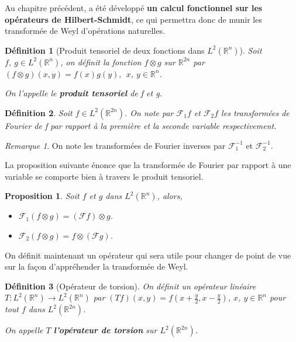 \documentclass[a4paper, 12pt]{report}
\newcommand{\R}{\mathbb{R}} %
\newcommand{\ra}[1][]{\overset{#1}{\rightarrow}} %
\renewcommand{\.}{\cdot} %
\theoremstyle{break}
\newtheorem{definition}{Définition}
\newtheorem{proposition}{Proposition}
\theoremstyle{remark}
\newtheorem{remark}{Remarque}
\theoremstyle{proofstyle}
\begin{document}
Au chapitre précédent, a été développé \textbf{un calcul fonctionnel sur les opérateurs de Hilbert-Schmidt}, ce qui permettra donc de munir les transformée de Weyl d'opérations naturelles.

\begin{definition}[Produit tensoriel de deux fonctions dans $L^2(\R^n)$]
    Soit $f, ~g \in L^2(\R^n)$, on définit la fonction $f \otimes g$ sur $\R^{2n}$ par $(f \otimes g)(x,y) = f(x)g(y),~~ x$, $y \in \R^n$. \vspace{5pt}

    On l'appelle le \textbf{produit tensoriel} de f et g.
\end{definition}

\begin{definition}
    Soit $f \in L^2(\R^{2n})$. On note par $\mathcal{F}_1f$ et $\mathcal{F}_2f$ les transformées de Fourier de f par rapport à la première et la seconde variable respectivement.
\end{definition}

\begin{remark}
    On note les transformées de Fourier inverses par $\mathcal{F}_1^{-1}$ et $\mathcal{F}_2^{-1}$.
\end{remark}

La proposition suivante énonce que la transformée de Fourier par rapport à une variable se comporte bien à travers le produit tensoriel.

\begin{proposition}
    Soit $f$ et $g$ dans $L^2(\R^n)$, alors,
    \begin{itemize}
        \item $\mathcal{F}_1(f \otimes g) = ( \mathcal{F}f) \otimes g$.
        \item $\mathcal{F}_2(f \otimes g) = f \otimes (\mathcal{F}g)$.
    \end{itemize}
\end{proposition}

On définit maintenant un opérateur qui sera utile pour changer de point de vue sur la façon d'appréhender la transformée de Weyl.

\begin{definition}[Opérateur de torsion]
    On définit un opérateur linéaire $T : L^2(\R^n) \ra L^2(\R^n)$ par $(T f)(x,y) = f(x+\frac{y}{2}, x - \frac{y}{2})$, $x$, $y \in \R^n$ pour tout $f$ dans $L^2(\R^{2n})$.

    On appelle $T$ \textbf{l'opérateur de torsion} sur $L^2(\R^{2n})$.
\end{definition}
\end{document}
